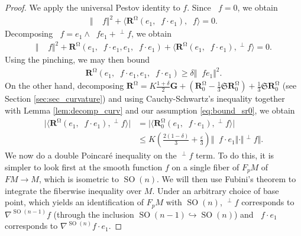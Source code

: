 \documentclass[12pt]{amsart}
\numberwithin{numbering}{section}
\theoremstyle{plain}
\theoremstyle{definition}
\theoremstyle{remark}
\numberwithin{equation}{section}
\DeclareMathOperator{\SO}{SO}
\DeclareMathOperator{\nv}{\nabla_{\mathbb{V}}}
\DeclareMathOperator{\xs}{\mathbb{X}^{\mg}}
\DeclareMathOperator{\mg}{\Omega}
\newcommand{\rsfm}{\mathbf{R}^{\mg}}
\newcommand{\frk}[1]{\mathfrak{#1}}
\begin{document}
\begin{proof}
We apply the universal Pestov identity to $f$. Since $\xs f = 0$, we obtain 
\begin{align*}
\Vert \xs \nv f \Vert^2 + \langle \rsfm(e_1, \nv f \cdot e_1), \nv f \rangle = 0.
\end{align*}
Decomposing $\nv f = e_1 \wedge \nv f e_1 + \nv^\perp f$, we obtain 
\begin{align*}
\Vert \xs \nv f \Vert^2 + \rsfm(e_1, \nv f \cdot e_1, e_1, \nv f \cdot e_1) + \langle \rsfm(e_1, \nv f \cdot e_1), \nv^\perp f \rangle = 0.
\end{align*}
Using the pinching, we may then bound 
\begin{align*}
\rsfm(e_1, \nv f \cdot e_1, e_1, \nv f \cdot e_1) \geq \delta \Vert \nv f e_1 \Vert^2.
\end{align*}
On the other hand, decomposing $\rsfm = K \frac{1+\delta}{2} \mathbf{G} + (\rsfm_0 - \frac{1}{3} \frk{S} \rsfm_0) + \frac{1}{3} \frk{S} \rsfm_0$ (see Section \ref{sec:sec_curvature}) and using Cauchy-Schwartz's inequality together with Lemma \ref{lem:decomp_curv} and our assumption \eqref{eq:bound_sr0}, we obtain
\begin{align*}
\vert \langle \rsfm(e_1, \nv f \cdot e_1), \nv^\perp f \rangle \vert 
&= \vert \langle \rsfm_0(e_1, \nv f \cdot e_1), \nv^\perp f \rangle \vert \\ 
&\leq K \left ( \frac{2(1-\delta)}{3} + \frac{\varepsilon}{3} \right ) \Vert \nv f \cdot e_1 \Vert \cdot \Vert \nv^\perp f \Vert.
\end{align*}
We now do a double Poincaré inequality on the $\nv^\perp f$ term. To do this, it is simpler to look first at the smooth function $f$ on a single fiber of $F_p M$ of $FM \to M$, which is isometric to $\SO(n)$. We will then use Fubini's theorem to integrate the fiberwise inequality over $M$. Under an arbitrary choice of base point, which yields an identification of $F_p M$  with $\SO(n)$, $\nv^\perp f$ corresponds to $\nabla^{\SO(n-1)} f$ (through the inclusion $\SO(n-1) \hookrightarrow \SO(n)$) and $\nv f \cdot e_1$ corresponds to $\nabla^{\SO(n)} f \cdot e_1$. 


\end{proof}
\end{document}
